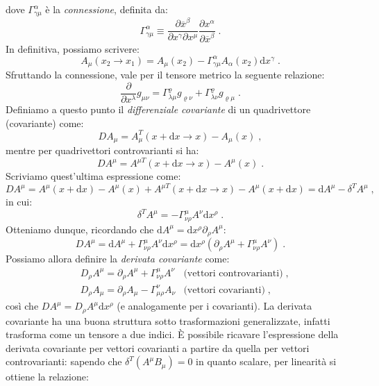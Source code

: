 \documentclass[12pt,a4paper]{report}
\theoremstyle{definition}
\newcommand{\diff}[1][]{\mathrm{d}#1}
\begin{document}
dove $\Gamma^{\alpha}_{\gamma\mu}$ è la \emph{connessione}, definita da:
\begin{equation}
\Gamma^{\alpha}_{\gamma\mu}\equiv \frac{\partial\overline{x}^{\beta}}{\partial x^{\gamma}\partial x^{\mu}}\frac{\partial x^{\alpha}}{\partial \overline{x}^{\beta}}\;. \label{ch1_connessione}
\end{equation}
In definitiva, possiamo scrivere:
\begin{equation}
A_{\mu}(x_2\to x_1)=A_{\mu}(x_2)-\Gamma^{\alpha}_{\gamma\mu}A_{\alpha}(x_2)\diff{x^{\gamma}}\;.
\end{equation}
Sfruttando la connessione, vale per il tensore metrico la seguente relazione:
\begin{equation}
\frac{\partial}{\partial x^{\lambda}}g_{\mu\nu}=\Gamma^{\varrho}_{\lambda\mu}g_{\varrho\nu}+\Gamma^{\varrho}_{\lambda\nu}g_{\varrho\mu}\;. \label{ch1_derivativeg}
\end{equation}
Definiamo a questo punto il \emph{differenziale covariante} di un quadrivettore (covariante) come:
\begin{equation}
DA_{\mu}=A_{\mu}^T(x+\diff{x}\to x)-A_{\mu}(x)\;,
\end{equation}
mentre per quadrivettori controvarianti si ha:
\begin{equation}
DA^{\mu}=A^{\mu T}(x+\diff{x}\to x)-A^{\mu}(x)\;.
\end{equation}
Scriviamo quest'ultima espressione come:
$$
DA^{\mu}=A^{\mu}(x+\diff{x})-A^{\mu}(x)+A^{\mu T}(x+\diff{x}\to x)-A^{\mu}(x+\diff{x})=\diff{A^{\mu}}-\delta^TA^{\mu}\;,
$$
in cui:
$$
\delta^TA^{\mu}=-\Gamma^{\mu}_{\nu\rho}A^{\nu}\diff{x^{\rho}}\;.
$$
Otteniamo dunque, ricordando che $\diff{A^{\mu}}=\diff{x^{\rho}}\partial_{\rho}A^{\mu}$:
$$
DA^{\mu}=\diff{A^{\mu}}+\Gamma^{\mu}_{\nu\rho}A^{\nu}\diff{x^{\rho}}=\diff{x^{\rho}}(\partial_{\rho}A^{\mu}+\Gamma^{\mu}_{\nu\rho}A^{\nu})\;.
$$
Possiamo allora definire la \emph{derivata covariante} come:
\begin{align}
&D_{\rho}A^{\mu}=\partial_{\rho}A^{\mu}+\Gamma^{\mu}_{\nu\rho}A^{\nu} &\mbox{(vettori controvarianti)}\;, \\
&D_{\rho}A_{\mu}=\partial_{\rho}A_{\mu}-\Gamma^{\nu}_{\mu\rho}A_{\nu} &\mbox{(vettori covarianti)}\;,
\end{align}
così che $DA^{\mu}=D_{\rho}A^{\mu}\diff{x^{\rho}}$ (e analogamente per i covarianti). La derivata covariante ha una buona struttura sotto trasformazioni generalizzate, infatti trasforma come un tensore a due indici. È possibile ricavare l'espressione della derivata covariante per vettori covarianti a partire da quella per vettori controvarianti: sapendo che $\delta^T(A^{\mu}B_{\mu})=0$ in quanto scalare, per linearità si ottiene la relazione:
\end{document}
